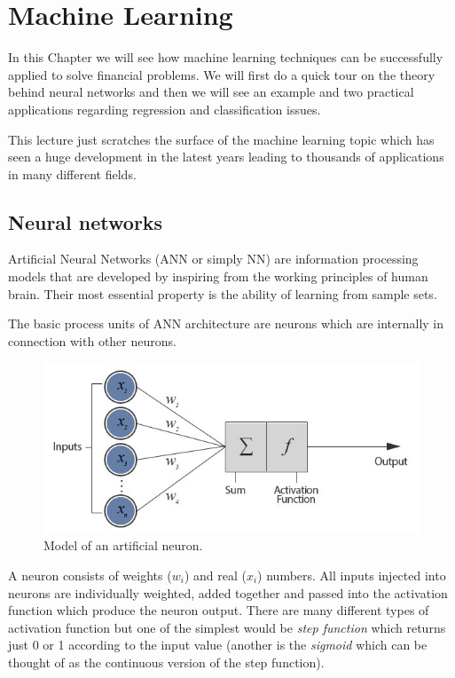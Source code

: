 \chapter{Machine Learning}\label{neural-network---practical-lesson-8}

In this Chapter we will see how machine learning techniques can be
successfully applied to solve financial problems. We will first do a
quick tour on the theory behind neural networks and then we will see an
example and two practical applications regarding regression and
classification issues.

This lecture just scratches the surface of the
machine learning topic which has seen a huge development in the latest
years leading to thousands of applications in many different fields.

\section{Neural networks}\label{neural-networks}

Artificial Neural Networks (ANN or simply NN) are information processing
models that are developed by inspiring from the working principles of
human brain. Their most essential property is the ability of learning
from sample sets.

The basic process units of ANN architecture are neurons which are
internally in connection with other neurons.

\begin{figure}
\centering
\includegraphics[width=0.8\linewidth]{figures/neuron.jpeg}
\caption{Model of an artificial neuron.}
\end{figure}

A neuron consists of weights (\(w_i\)) and real (\(x_i\)) numbers. All
inputs injected into neurons are individually weighted, added together
and passed into the activation function which produce the neuron output.
There are many different types of activation function but one of the
simplest would be \emph{step function} which returns just 0 or 1
according to the input value (another is the \emph{sigmoid} which can be
thought of as the continuous version of the step function).

